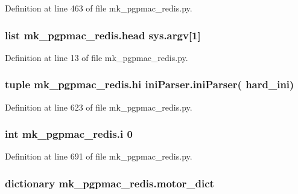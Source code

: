 Definition at line 463 of file mk\-\_\-pgpmac\-\_\-redis.\-py.

\hypertarget{namespacemk__pgpmac__redis_a760ff4955cbf5beef4ae36a28c30b01a}{
\subsubsection[{head}]{\setlength{\rightskip}{0pt plus 5cm}list mk\-\_\-pgpmac\-\_\-redis.\-head sys.\-argv\mbox{[}1\mbox{]}}}\label{namespacemk__pgpmac__redis_a760ff4955cbf5beef4ae36a28c30b01a}


Definition at line 13 of file mk\-\_\-pgpmac\-\_\-redis.\-py.

\hypertarget{namespacemk__pgpmac__redis_af0e472a4df25fc5c1660ef07226689a8}{
\subsubsection[{hi}]{\setlength{\rightskip}{0pt plus 5cm}tuple mk\-\_\-pgpmac\-\_\-redis.\-hi {\bf ini\-Parser.\-ini\-Parser}( {\bf hard\-\_\-ini})}}\label{namespacemk__pgpmac__redis_af0e472a4df25fc5c1660ef07226689a8}


Definition at line 623 of file mk\-\_\-pgpmac\-\_\-redis.\-py.

\hypertarget{namespacemk__pgpmac__redis_afa643a23a5984fe44c2182ada3dfa401}{
\subsubsection[{i}]{\setlength{\rightskip}{0pt plus 5cm}int mk\-\_\-pgpmac\-\_\-redis.\-i 0}}\label{namespacemk__pgpmac__redis_afa643a23a5984fe44c2182ada3dfa401}


Definition at line 691 of file mk\-\_\-pgpmac\-\_\-redis.\-py.

\hypertarget{namespacemk__pgpmac__redis_ad8583d4fe88c4c98af73d2858c51c660}{
\subsubsection[{motor\-\_\-dict}]{\setlength{\rightskip}{0pt plus 5cm}dictionary mk\-\_\-pgpmac\-\_\-redis.\-motor\-\_\-dict}}\label{namespacemk__pgpmac__redis_ad8583d4fe88c4c98af73d2858c51c660}


